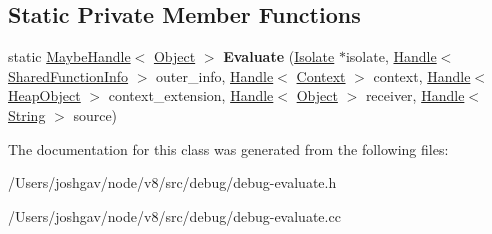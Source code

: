 \subsection*{Static Private Member Functions}
\begin{DoxyCompactItemize}
\item 
static \hyperlink{classv8_1_1internal_1_1_maybe_handle}{Maybe\+Handle}$<$ \hyperlink{classv8_1_1internal_1_1_object}{Object} $>$ {\bfseries Evaluate} (\hyperlink{classv8_1_1internal_1_1_isolate}{Isolate} $\ast$isolate, \hyperlink{classv8_1_1internal_1_1_handle}{Handle}$<$ \hyperlink{classv8_1_1internal_1_1_shared_function_info}{Shared\+Function\+Info} $>$ outer\+\_\+info, \hyperlink{classv8_1_1internal_1_1_handle}{Handle}$<$ \hyperlink{classv8_1_1internal_1_1_context}{Context} $>$ context, \hyperlink{classv8_1_1internal_1_1_handle}{Handle}$<$ \hyperlink{classv8_1_1internal_1_1_heap_object}{Heap\+Object} $>$ context\+\_\+extension, \hyperlink{classv8_1_1internal_1_1_handle}{Handle}$<$ \hyperlink{classv8_1_1internal_1_1_object}{Object} $>$ receiver, \hyperlink{classv8_1_1internal_1_1_handle}{Handle}$<$ \hyperlink{classv8_1_1internal_1_1_string}{String} $>$ source)\hypertarget{classv8_1_1internal_1_1_debug_evaluate_aae95e947c181c7988e49cd71ac2ee882}{}\label{classv8_1_1internal_1_1_debug_evaluate_aae95e947c181c7988e49cd71ac2ee882}

\end{DoxyCompactItemize}


The documentation for this class was generated from the following files\+:\begin{DoxyCompactItemize}
\item 
/\+Users/joshgav/node/v8/src/debug/debug-\/evaluate.\+h\item 
/\+Users/joshgav/node/v8/src/debug/debug-\/evaluate.\+cc\end{DoxyCompactItemize}

